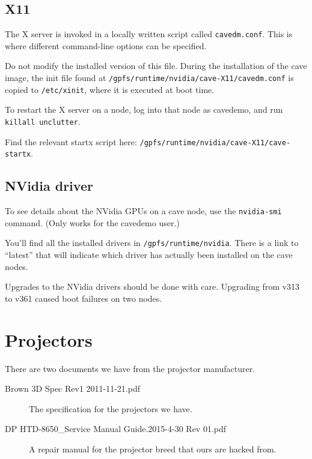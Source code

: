 \documentclass[11pt]{article}
\newcommand{\cmd}[1]{\texttt{#1}\xspace}
\begin{document}
\subsection{X11}

The X server is invoked in a locally written script called
\cmd{cavedm.conf}.  This is where different command-line options
can be specified.

Do not modify the installed version of this file.  During the
installation of the cave image, the init file found at
\cmd{/gpfs/runtime/nvidia/cave-X11/cavedm.conf} is copied to
\cmd{/etc/xinit}, where it is executed at boot time.

To restart the X server on a node, log into that node as cavedemo, and
run \cmd{killall unclutter}.

Find the relevant startx script here:
\cmd{/gpfs/runtime/nvidia/cave-X11/cave-startx}.


\subsection{NVidia driver}

To see details about the NVidia GPUs on a cave node, use the
\cmd{nvidia-smi} command.  (Only works for the cavedemo user.)

You'll find all the installed drivers in
\cmd{/gpfs/runtime/nvidia}.  There is a link to ``latest'' that
will indicate which driver has actually been installed on the cave nodes.

Upgrades to the NVidia drivers should be done with care.  Upgrading
from v313 to v361 caused boot failures on two nodes.


\section{Projectors}

There are two documents we have from the projector manufacturer.  


\begin{description}

\item[Brown 3D Spec Rev1 2011-11-21.pdf]  The specification for the
  projectors we have.

\item[DP HTD-8650\_Service Manual Guide.2015-4-30 Rev 01.pdf] A repair
  manual for the projector breed that ours are hacked from.

\end{description}
\end{document}
